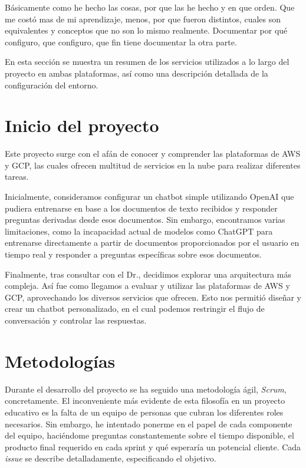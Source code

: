 Básicamente como he hecho las cosas, por que las he hecho y en que orden. Que me costó mas de mi aprendizaje, menos, por que fueron distintos, cuales son equivalentes y conceptos que no son lo mismo realmente. Documentar por qué configuro, que configuro, que fin tiene documentar la otra parte.

En esta sección se muestra un resumen de los servicios utilizados a lo largo del proyecto en ambas plataformas, así como una descripción detallada de la configuración del entorno. 

\section{Inicio del proyecto}\label{inicio-del-proyecto}
Este proyecto surge con el afán de conocer y comprender las plataformas de AWS y GCP, las cuales ofrecen multitud de servicios en la nube para realizar diferentes tareas. 

Inicialmente, consideramos configurar un chatbot simple utilizando OpenAI que pudiera entrenarse en base a los documentos de texto recibidos y responder preguntas derivadas desde esos documentos.  Sin embargo, encontramos varias limitaciones, como la incapacidad actual de modelos como ChatGPT para entrenarse directamente a partir de documentos proporcionados por el usuario en tiempo real y responder a preguntas específicas sobre esos documentos. 

Finalmente, tras consultar con el Dr., decidimos explorar una arquitectura más compleja. Así fue como llegamos a evaluar y utilizar las plataformas de AWS y GCP, aprovechando los diversos servicios que ofrecen. Esto nos permitió diseñar y crear un chatbot personalizado, en el cual podemos restringir el flujo de conversación y controlar las respuestas.

\section{Metodologías}\label{Metodologías}
Durante el desarrollo del proyecto se ha seguido una metodología ágil, \textit{Scrum}, concretamente. El  inconveniente más evidente de esta filosofía en un proyecto educativo es la falta de un equipo de personas que cubran los diferentes roles necesarios. Sin embargo, he intentado ponerme en el papel de cada componente del equipo, haciéndome preguntas constantemente sobre el tiempo disponible, el producto final requerido en cada sprint y qué esperaría un potencial cliente. Cada \textit{issue} se describe detalladamente, especificando el objetivo.  

